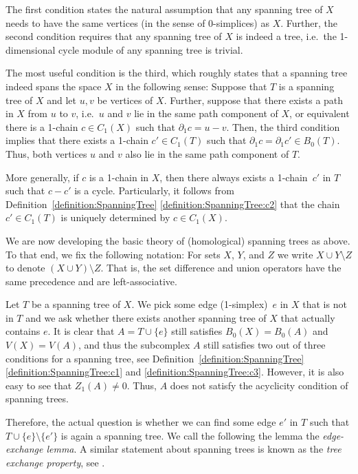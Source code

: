 \documentclass[oneside]{amsart}
\theoremstyle{definition}
\begin{document}
The first condition states the natural assumption that any spanning tree of $X$ needs to have the same vertices (in the sense of 0-simplices) as $X$.
Further, the second condition requires that any spanning tree of $X$ is indeed a tree, i.e.\ the 1-dimensional cycle module of any spanning tree is trivial.

The most useful condition is the third, which roughly states that a spanning tree indeed spans the space $X$ in the following sense:
Suppose that $T$ is a spanning tree of $X$ and let $u, v$ be vertices of $X$.
Further, suppose that there exists a path in $X$ from $u$ to $v$, i.e.\ $u$ and $v$ lie in the same path component of $X$, or equivalent there is a 1-chain $c \in C_1(X)$ such that $\partial_1 c = u - v$.
Then, the third condition implies that there exists a 1-chain $c' \in C_1(T)$ such that $\partial_1 c = \partial_1 c' \in B_0(T)$.
Thus, both vertices $u$ and $v$ also lie in the same path component of $T$.

More generally, if $c$ is a 1-chain in $X$, then there always exists a 1-chain~$c'$ in $T$ such that $c - c'$ is a cycle.
Particularly, it follows from Definition~\ref{definition:SpanningTree} \ref{definition:SpanningTree:c2} that the chain $c' \in C_1(T)$ is uniquely determined by $c \in C_1(X)$.

We are now developing the basic theory of (homological) spanning trees as above.
To that end, we fix the following notation:
For sets $X$, $Y$, and $Z$ we write $X \cup Y \setminus Z$ to denote $(X \cup Y) \setminus Z$.
That is, the set difference and union operators have the same precedence and are left-associative.

Let $T$ be a spanning tree of $X$.
We pick some edge (1-simplex)~$e$ in $X$ that is not in $T$ and we ask whether there exists another spanning tree of $X$ that actually contains $e$.
It is clear that $A = T \cup \{ e \}$ still satisfies $B_0(X) = B_0(A)$ and $V(X) = V(A)$, and thus the subcomplex $A$ still satisfies two out of three conditions for a spanning tree, see Definition~\ref{definition:SpanningTree} \ref{definition:SpanningTree:c1} and \ref{definition:SpanningTree:c3}.
However, it is also easy to see that $Z_1(A) \neq 0$.
Thus, $A$ does not satisfy the acyclicity condition of spanning trees.

Therefore, the actual question is whether we can find some edge $e'$ in $T$ such that $T \cup \{ e \} \setminus \{ e' \}$ is again a spanning tree.
We call the following the lemma the \emph{edge-exchange lemma}.
A similar statement about spanning trees is known as the \emph{tree exchange property}, see \cite[p.\ 113, Exercise 4.3.2]{BondyMurty2008}.
\end{document}
